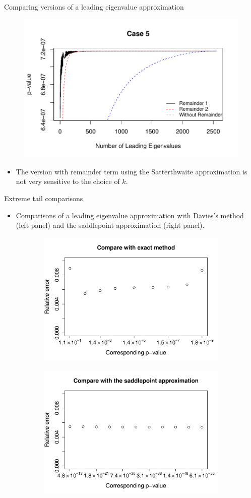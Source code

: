 \documentclass{beamer}
\begin{document}
\begin{frame}{Comparing versions of a leading eigenvalue approximation}
\begin{figure}[H]	 
	\includegraphics[scale = 0.6]{Rplot15.pdf}
\end{figure} 
\begin{itemize}
    \item The version with remainder term using the Satterthwaite approximation is not very sensitive to the choice of $k$.
\end{itemize}
\end{frame}

\begin{frame}{Extreme tail comparisons}
\begin{itemize}
    \item Comparisons of a leading eigenvalue approximation with Davies's method (left panel) and the saddlepoint approximation (right panel).
\end{itemize}
\begin{figure}[H]	 
 	\begin{subfigure}
 		\centering
 		\includegraphics[width=0.45\linewidth]{Rplots5.pdf}
 	\end{subfigure}	
 	\begin{subfigure}
 		\centering
 		\includegraphics[width=0.45\linewidth]{Rplots6.pdf}
 	\end{subfigure}	
 \end{figure}    
\end{frame}
\end{document}
